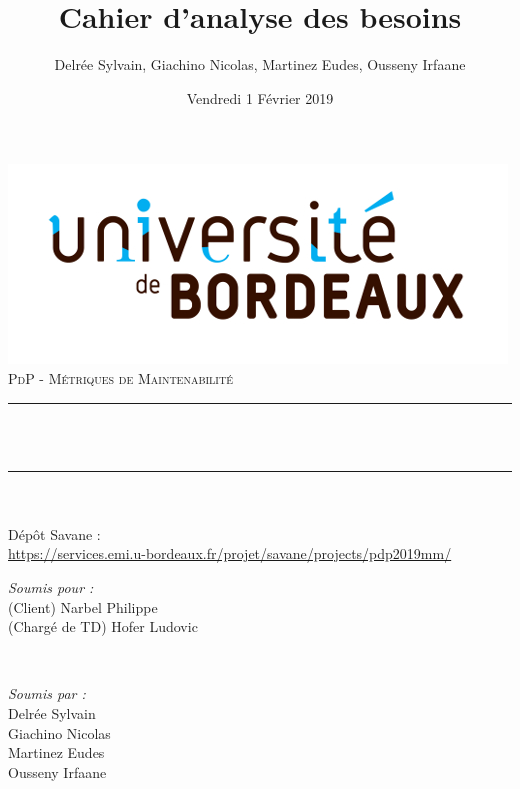 \documentclass{scrartcl}
\title{Cahier d'analyse des besoins}
\author{Delrée Sylvain, Giachino Nicolas, Martinez Eudes, Ousseny Irfaane}
\date{Vendredi 1 Février 2019}
\makeatletter
\let\thetitle\@title
\let\thedate\@date
\makeatother
\begin{document}
\begin{titlepage}
	\centering
    \vspace*{0.5 cm}
    \includegraphics[scale = 0.5]{img/logo.jpg}\\[1.0 cm]
    \textsc{\LARGE PdP - Métriques de Maintenabilité}\\[1.0 cm]
	\rule{\linewidth}{0.2 mm} \\[0.4 cm]
	{ \huge \bfseries \thetitle}\\
	\rule{\linewidth}{0.2 mm} \\[0.5 cm]
	{\small \thedate}\\[0.5 cm]
	{\small Dépôt Savane :\\ \url{https://services.emi.u-bordeaux.fr/projet/savane/projects/pdp2019mm/}}\\[1.5 cm]
	
	\begin{minipage}{0.4\textwidth}
		\begin{flushleft} \large
			\emph{Soumis pour :}\\
			(Client) Narbel Philippe\\
            (Chargé de TD) Hofer Ludovic\\
		\end{flushleft}
	\end{minipage}~
	\begin{minipage}{0.4\textwidth}
        \begin{flushright} \large
			\emph{Soumis par :} \\
			Delrée Sylvain\\
            Giachino Nicolas\\
            Martinez Eudes\\
            Ousseny Irfaane\\
		\end{flushright}
	\end{minipage}\\[2 cm]
	
\end{titlepage}
\end{document}
